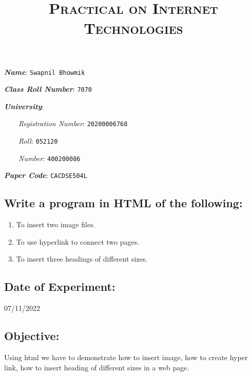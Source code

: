 \documentclass[12pt, a4paper]{article}
\title{\Huge{\textsc{Practical on Internet Technologies}}}
\author{}
\date{}
\begin{document}
\parindent0pt

  \begin{titlingpage}
    \maketitle
    \thispagestyle{empty}
    \begin{tcolorbox}
      \textbf{\emph{Name}}: \verb+Swapnil Bhowmik+

      \textbf{\emph{Class Roll Number}}: \verb+7070+

      \textbf{\emph{University}}:

      \ \ \ \ \emph{Registration Number}: \verb+20200006768+

      \ \ \ \ \emph{Roll}: \verb+052120+

      \ \ \ \ \emph{Number}: \verb+400200086+

      \textbf{\emph{Paper Code}}: \verb+CACDSE504L+
    \end{tcolorbox}
  \end{titlingpage}
  \newpage



\begin{tcolorbox}
  \section{Write a program in HTML of the following:}
  \begin{enumerate}
    \item{To insert two image files.}
    \item{To use hyperlink to connect two pages.}
    \item{To insert three headings of different sizes.}
  \end{enumerate}
\end{tcolorbox}
\subsection*{Date of Experiment:}
07/11/2022
\subsection*{Objective:}
Using html we have to demonstrate how to insert image, how to create hyper link, how to insert heading of different sizes in a web page.
\end{document}
